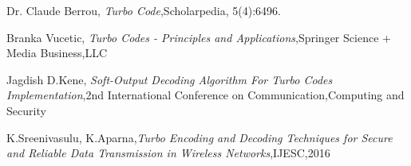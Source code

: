 \documentclass[conference,a4paper]{IEEEtran}
\begin{document}









%
%
%
\vspace{7pt}
\begin{thebibliography}{1}


Dr. Claude Berrou, \emph{Turbo Code},Scholarpedia, 5(4):6496.

Branka Vucetic, \emph{Turbo Codes - Principles and Applications},Springer Science + Media Business,LLC

Jagdish D.Kene, \emph{Soft-Output Decoding Algorithm For Turbo Codes Implementation},2nd International Conference on Communication,Computing and Security

K.Sreenivasulu, K.Aparna,\emph{Turbo Encoding and Decoding Techniques for Secure and Reliable
Data Transmission in Wireless Networks},IJESC,2016

\end{thebibliography}


\end{document}
